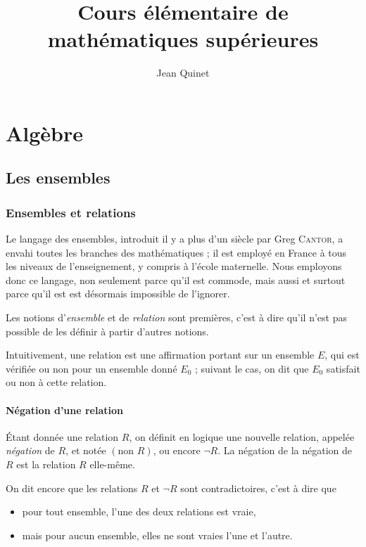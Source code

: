 \documentclass[10pt,parskip=half,chapterprefix=true]{scrbook}
\title{Cours élémentaire de mathématiques supérieures}
\author{Jean Quinet}
\begin{document}
\frontmatter

\maketitle
\tableofcontents

\mainmatter

\part{Algèbre}

\chapter{Les ensembles}

\section{Ensembles et relations}

Le langage des ensembles, introduit il y a plus d'un siècle par Greg
\textsc{Cantor}, a envahi toutes les branches des mathématiques ; il
est employé en France à tous les niveaux de l'enseignement, y compris
à l'école maternelle. Nous employons donc ce langage, non seulement
parce qu'il est commode, mais aussi et surtout parce qu'il est est
désormais impossible de l'ignorer.

Les notions d'\emph{ensemble} et de \emph{relation} sont premières,
c'est à dire qu'il n'est pas possible de les définir à partir d'autres
notions.

Intuitivement, une relation est une affirmation portant sur un
ensemble \(E\), qui est vérifiée ou non pour un ensemble donné \(E_0\)
; suivant le cas, on dit que \(E_0\) satisfait ou non à cette
relation.

\subsection*{Négation d'une relation}

Étant donnée une relation \(R\), on définit en logique une nouvelle
relation, appelée \emph{négation} de \(R\), et notée
\((\text{non }R)\), ou encore \(\neg R\). La négation de la négation
de \(R\) est la relation \(R\) elle-même.

On dit encore que les relations \(R\) et \(\neg R\) sont
contradictoires, c'est à dire que
\begin{itemize}
\item pour tout ensemble, l'une des deux relations est vraie,
\item mais pour aucun ensemble, elles ne sont vraies l'une et l'autre.
\end{itemize}
\end{document}

